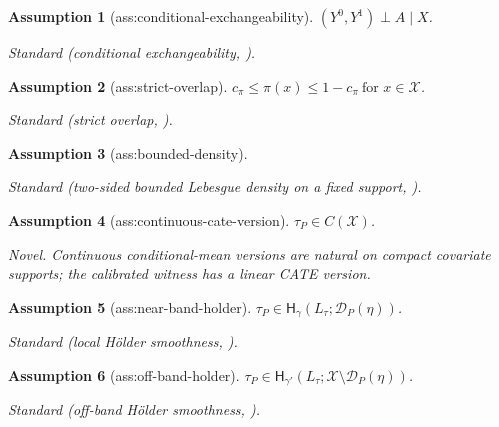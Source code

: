 \documentclass{article}
\newtheorem{assumption}{Assumption}
\begin{document}
\begin{assumption}[ass:conditional-exchangeability]\label{ass:conditional-exchangeability}
\((Y^0,Y^1)\perp A\mid X\).
\par\smallskip\noindent\emph{Standard} (conditional exchangeability, \cite{BonviniKennedyKeele2023MinimaxSubgroup}).
\end{assumption}

\begin{assumption}[ass:strict-overlap]\label{ass:strict-overlap}
\(c_\pi\le\pi(x)\le1-c_\pi\ \text{for }x\in\mathcal X\).
\par\smallskip\noindent\emph{Standard} (strict overlap, \cite{BonviniKennedyKeele2023MinimaxSubgroup}).
\end{assumption}

\begin{assumption}[ass:bounded-density]\label{ass:bounded-density}
\leavevmode\par\noindent {}\par\noindent
\par\smallskip\noindent\emph{Standard} (two-sided bounded Lebesgue density on a fixed support, \cite{BonviniKennedyKeele2023MinimaxSubgroup}).
\end{assumption}

\begin{assumption}[ass:continuous-cate-version]\label{ass:continuous-cate-version}
\(\tau_P\in C(\mathcal X)\).
\par\smallskip\noindent\emph{Novel.} Continuous conditional-mean versions are natural on compact covariate supports; the calibrated witness has a linear CATE version.
\end{assumption}

\begin{assumption}[ass:near-band-holder]\label{ass:near-band-holder}
\(\tau_P\in\mathsf H_\gamma(L_\tau;\mathcal D_P(\eta))\).
\par\smallskip\noindent\emph{Standard} (local Hölder smoothness, \cite{BonviniKennedyKeele2023MinimaxSubgroup}).
\end{assumption}

\begin{assumption}[ass:off-band-holder]\label{ass:off-band-holder}
\(\tau_P\in\mathsf H_{\gamma'}(L_\tau;\mathcal X\setminus\mathcal D_P(\eta))\).
\par\smallskip\noindent\emph{Standard} (off-band Hölder smoothness, \cite{BonviniKennedyKeele2023MinimaxSubgroup}).
\end{assumption}
\end{document}
